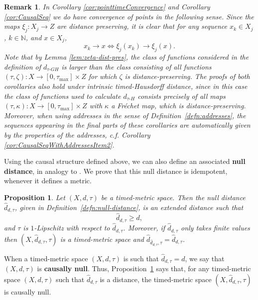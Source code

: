 \documentclass[a4paper,12pt,reqno]{amsart}
\theoremstyle{plain}
\newtheorem{prop}[thm]{Proposition}
\newtheorem{rmrk}[thm]{Remark}
\def\iff{\Longleftrightarrow}
\begin{document}
\begin{rmrk}\label{rmrk-pointandtimeC}
In Corollary \ref{cor:pointtimeConvergence}
and Corollary \ref{cor:CausalSeq} we do have convergence of points in the following sense. Since the maps $\xi_j:X_j \to Z$ are distance preserving, it is clear that 
for any sequence $x_k \in X_j$, $k \in \mathbb N$, and $x \in X_j$,
\[
x_k \to x \iff \xi_j(x_k) \to \xi_j(x).
\]
Note that by  
Lemma \ref{lem:zeta-dist-pres}, the class of functions considered in the definition of $d_{\tau\text{-}GH}$ is larger than the class consisting of all functions $(\tau,\zeta): X \to [0,\tau_{\max}] \times Z$ for which $\zeta$ is distance-preserving. The proofs of both corollaries also hold under 
intrinsic timed-Hausdorff distance, since in this case the class of functions 
used to calculate $d_{\tau\text{-}H}$ consists precisely of all maps $(\tau,\kappa): X \to [0,\tau_{\max}] \times Z$ with $\kappa$ a Fr\'echet map, which is distance-preserving.  Moreover, when using addresses in the sense of Definition~\ref{defn:addresses}, the sequences appearing in the final parts of these corollaries
are automatically given by the properties of the addresses,  c.f. Corollary \ref{cor:CausalSeqWithAddressesItem2}.

\end{rmrk}

Using the causal structure defined above, we can also define an associated \textbf{null distance}, in analogy to 
\cite{SV-Null}. We prove that this null distance is idempotent, whenever it defines a metric. 

\begin{prop}\label{prop-null-distance is greater}
Let $(X,d,\tau)$ be a timed-metric space. 
Then the null distance $\hat{d}_{d,\tau}$, given in Definition~\ref{defn:null-distance}, is an extended distance such that
\begin{equation}\label{eq:null-distance is greater}
\hat{d}_{d,\tau}\geq d,
\end{equation}
and $\tau$ is $1$-Lipschitz with respect to $\hat{d}_{d,\tau}$.
Moreover, if $\hat{d}_{d,\tau}$ only takes finite values then $(X,\hat{d}_{d,\tau},\tau)$ is a timed-metric space and $\hat{d}_{\hat{d}_{d,\tau},\tau} = \hat{d}_{d,\tau}$.
\end{prop}

When a timed-metric space $(X,d,\tau)$ is such that $\hat{d}_{d,\tau}=d$, we say that $(X,d,\tau)$ is \textbf{causally null}. Thus, Proposition~\ref{prop-null-distance is greater}
says that, for any timed-metric space $(X, d, \tau)$ such that $\hat{d}_{d,\tau}$ is a distance, the timed-metric space $(X, \hat{d}_{d,\tau},\tau)$ is causally
null.
\end{document}
